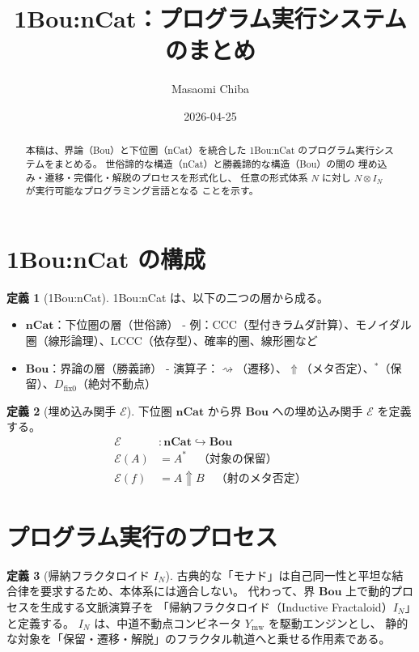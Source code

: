 \documentclass[11pt,a4paper]{article}
\theoremstyle{definition}
\newtheorem{definition}{定義}[section]
\newcommand{\dfix}{D_{\mathrm{fix}0}} %
\newcommand{\metanegation}{\Uparrow}
\newcommand{\Bou}{\mathbf{Bou}}
\newcommand{\nCat}{\mathbf{nCat}}
\newcommand{\Leadsto}{\rightsquigarrow}
\newcommand{\susp}[1]{#1^*}
\newcommand{\Ymw}{Y_{\mathrm{mw}}}
\begin{document}
\title{1Bou:nCat：プログラム実行システムのまとめ}
\author{Masaomi Chiba}
\date{2026-04-25}
\maketitle

\begin{abstract}
本稿は、界論（Bou）と下位圏（nCat）を統合した
1Bou:nCat のプログラム実行システムをまとめる。
世俗諦的な構造（nCat）と勝義諦的な構造（Bou）の間の
埋め込み・遷移・完備化・解脱のプロセスを形式化し、
任意の形式体系 $N$ に対し $N \otimes I_N$ が実行可能なプログラミング言語となる
ことを示す。
\end{abstract}

\section{1Bou:nCat の構成}

\begin{definition}[1Bou:nCat]
1Bou:nCat は、以下の二つの層から成る。
\begin{itemize}
\item $\nCat$：下位圏の層（世俗諦）  
  - 例：CCC（型付きラムダ計算）、モノイダル圏（線形論理）、LCCC（依存型）、確率的圏、線形圏など
\item $\Bou$：界論の層（勝義諦）  
  - 演算子：$\Leadsto$（遷移）、$\metanegation$（メタ否定）、$\susp{}$（保留）、$\dfix$（絶対不動点）
\end{itemize}
\end{definition}

\begin{definition}[埋め込み関手 $\mathcal{E}$]
下位圏 $\nCat$ から界 $\Bou$ への埋め込み関手 $\mathcal{E}$ を定義する。
\begin{align*}
\mathcal{E} &: \nCat \hookrightarrow \Bou \\
\mathcal{E}(A) &= \susp{A} \quad\text{（対象の保留）} \\
\mathcal{E}(f) &= A \metanegation B \quad\text{（射のメタ否定）}
\end{align*}
\end{definition}

\section{プログラム実行のプロセス}

\begin{definition}[帰納フラクタロイド $I_N$]
古典的な「モナド」は自己同一性と平坦な結合律を要求するため、本体系には適合しない。
代わって、界 $\Bou$ 上で動的プロセスを生成する文脈演算子を
「帰納フラクタロイド（Inductive Fractaloid）$I_N$」と定義する。
$I_N$ は、中道不動点コンビネータ $\Ymw$ を駆動エンジンとし、
静的な対象を「保留・遷移・解脱」のフラクタル軌道へと乗せる作用素である。
\end{definition}
\end{document}
